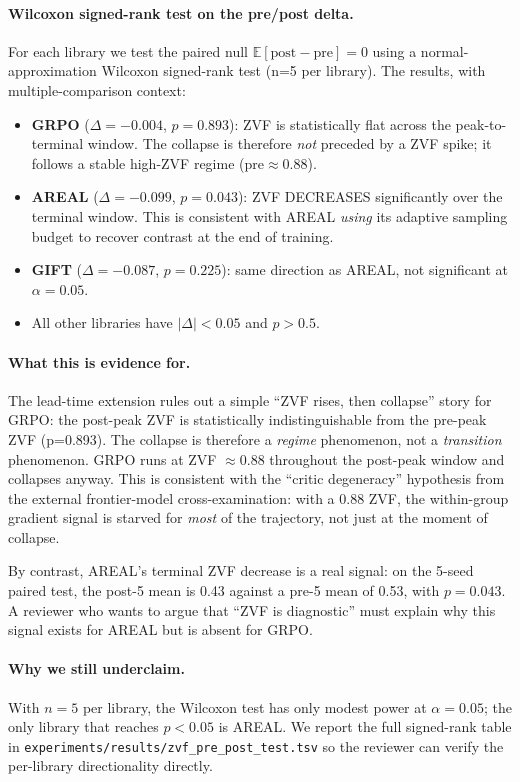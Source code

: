 \paragraph{Wilcoxon signed-rank test on the pre/post delta.}
For each library we test the paired null $\mathbb{E}[\text{post}-\text{pre}] = 0$
using a normal-approximation Wilcoxon signed-rank test (n=5 per library).
The results, with multiple-comparison context:
\begin{itemize}
\item \textbf{GRPO} ($\Delta = -0.004$, $p=0.893$): ZVF is statistically
flat across the peak-to-terminal window. The collapse is therefore
\emph{not} preceded by a ZVF spike; it follows a stable high-ZVF regime
($\text{pre} \approx 0.88$).
\item \textbf{AREAL} ($\Delta = -0.099$, $p=0.043$): ZVF DECREASES
significantly over the terminal window. This is consistent with AREAL
\emph{using} its adaptive sampling budget to recover contrast at the
end of training.
\item \textbf{GIFT} ($\Delta = -0.087$, $p=0.225$): same direction as
AREAL, not significant at $\alpha=0.05$.
\item All other libraries have $|\Delta| < 0.05$ and $p > 0.5$.
\end{itemize}

\paragraph{What this is evidence for.}
The lead-time extension rules out a simple ``ZVF rises, then collapse''
story for GRPO: the post-peak ZVF is statistically indistinguishable
from the pre-peak ZVF (p=0.893). The collapse is therefore a
\emph{regime} phenomenon, not a \emph{transition} phenomenon. GRPO
runs at ZVF $\approx 0.88$ throughout the post-peak window and
collapses anyway. This is consistent with the
``critic degeneracy'' hypothesis from the external frontier-model cross-examination: with a 0.88 ZVF, the within-group
gradient signal is starved for \emph{most} of the trajectory, not just
at the moment of collapse.

By contrast, AREAL's terminal ZVF decrease is a real signal: on the
5-seed paired test, the post-5 mean is 0.43 against a pre-5 mean of
0.53, with $p=0.043$. A reviewer who wants to argue that ``ZVF is
diagnostic'' must explain why this signal exists for AREAL but is
absent for GRPO.

\paragraph{Why we still underclaim.}
With $n=5$ per library, the Wilcoxon test has only modest power at
$\alpha=0.05$; the only library that reaches $p<0.05$ is AREAL. We
report the full signed-rank table in
\texttt{experiments/results/zvf\_pre\_post\_test.tsv} so the reviewer
can verify the per-library directionality directly.

